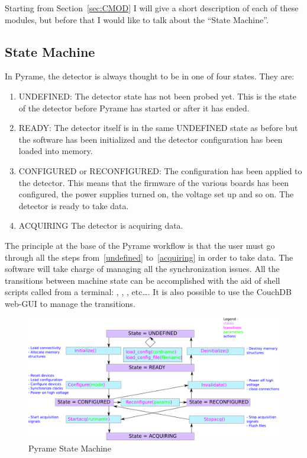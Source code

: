 Starting from Section~\ref{sec:CMOD} I will give a short description
of each of these modules, but before that I would like to talk about
the ``State Machine''.

\subsection{State Machine}
In Pyrame, the detector is always thought to be in one of four
states. They are:
\begin{enumerate}
\item\label{undefined} UNDEFINED: The detector state has not been
  probed yet. This is the state of the detector before Pyrame has
  started or after it has ended.
\item READY: The detector itself is in the same UNDEFINED state as
  before but the software has been initialized and the detector
  configuration has been loaded into memory.
\item CONFIGURED or RECONFIGURED: The configuration has been applied
  to the detector. This means that the firmware of the various boards
  has been configured, the power supplies turned on, the voltage set
  up and so on. The detector is ready to take data.
\item\label{acquiring} ACQUIRING The detector is acquiring data.
\end{enumerate}
The principle at the base of the Pyrame workflow is that the user must
go through all the steps from~\ref{undefined} to~\ref{acquiring} in
order to take data. The software will take charge of managing all the
synchronization issues.  All the transitions between machine state can
be accomplished with the aid of shell scripts called from a terminal:
, ,
, etc\dots. It is also possible to use the
CouchDB web-GUI to manage the transitions.
\begin{figure}
  \includegraphics[width=\linewidth]{state_machine.doc.png}
  \caption{Pyrame State Machine}
  \label{fig:state-machine}
\end{figure}

